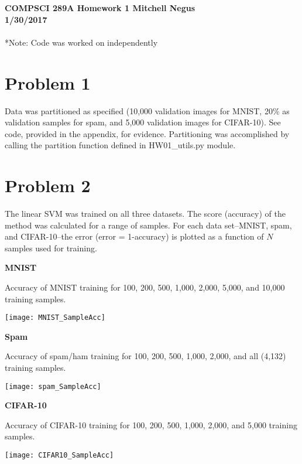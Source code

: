 \documentclass{report}
\begin{document}
{\bf {\large {COMPSCI 289A} Homework {1} \hfill {Mitchell Negus\\1/30/2017}}}\\\\
*Note: Code was worked on independently

\section*{Problem 1}

Data was partitioned as specified (10,000 validation images for MNIST, 20\% as validation samples for spam, and 5,000 validation images for CIFAR-10). 
See code, provided in the appendix, for evidence. Partitioning was accomplished by calling the partition function defined in HW01\_utils.py module.

\vspace{1.5cm}

\section*{Problem 2}

The linear SVM was trained on all three datasets. The score (accuracy) of the method was calculated for a range of samples. For each data set--MNIST, spam, and CIFAR-10--the error (error = 1-accuracy) is plotted as a function of $N$ samples used for training.

\vspace{0.5cm}
\textbf{MNIST}

Accuracy of MNIST training for 100, 200, 500, 1,000, 2,000, 5,000, and 10,000 training samples.

\texttt{[image: MNIST\_SampleAcc]}

\newpage

\textbf{Spam}

Accuracy of spam/ham training for 100, 200, 500, 1,000, 2,000, and all (4,132) training samples.

\texttt{[image: spam\_SampleAcc]}

\vspace{0.5cm}
\textbf{CIFAR-10}

Accuracy of CIFAR-10 training for 100, 200, 500, 1,000, 2,000, and 5,000 training samples.

\texttt{[image: CIFAR10\_SampleAcc]}	
\end{document}
